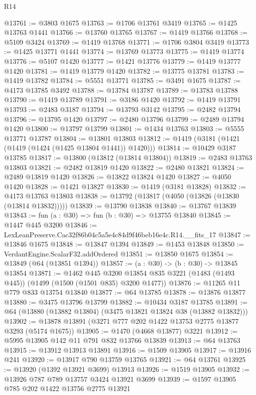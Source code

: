 \begin{lexlean}{R14}
\begin{coremodule}
@13761 := @3803 @1675
@13763 := @1706 @13761 @3419
@13765 := @1425 @13763 @1441
@13766 := @13760 @13765
@13767 := @1419 @13766
@13768 := @5109 @3424
@13769 := @1419 @13768
@13771 := @1706 @3804 @3419
@13773 := @1425 @13771 @1441
@13774 := @13769 @13773
@13775 := @1419 @13774
@13776 := @5107 @1420
@13777 := @1421 @13776
@13779 := @1419 @13777 @1420
@13781 := @1419 @13779 @1420
@13782 := @13775 @13781
@13783 := @1419 @13782
@13784 := @5551 @13771
@13785 := @3491 @1675
@13787 := @4173 @13785 @3492
@13788 := @13784 @13787
@13789 := @13783 @13788
@13790 := @1419 @13789
@13791 := @3186 @1420
@13792 := @1419 @13791
@13793 := @2483 @3187
@13794 := @13793 @3142
@13795 := @2482 @13794
@13796 := @13795 @1420
@13797 := @2480 @13796
@13799 := @2489 @13794 @1420
@13800 := @13797 @13799
@13801 := @1434 @13763
@13803 := @5555 @13771 @13787
@13804 := @13801 @13803
@13812 := @1419 (@3181 (@1421 (@1419 (@1424 (@1425 @13804 @1441)) @1420)))
@13814 := @10429 @3187 @13785
@13817 := @13800 (@13812 (@13814 @13804))
@13819 := @2483 @13763 @13803
@13821 := @2482 @13819 @1420
@13822 := @2480 @13821
@13824 := @2489 @13819 @1420
@13826 := @13822 @13824 @1420
@13827 := @4050 @1420
@13828 := @1421 @13827
@13830 := @1419 (@3181 @13828)
@13832 := @4173 @13763 @13803
@13838 := @13792 (@13817 (@4050 (@13826 (@13830 (@13814 @13832)))))
@13839 := @13790 @13838
@13840 := @13767 @13839
@13843 := fun (a : @30) => fun (b : @30) => @13755 @13840
@13845 := @1447 @445 @3200
@13846 := LexLeanPreserve.Cac32f86b04c5a5e4c84d9f46beb16e4c.R14.__fits_17
@13847 := @13846 @1675
@13848 := @13847 @1394
@13849 := @1453 @13848
@13850 := VerdantEngine.ScalarF32.addOrdered
@13851 := @13850 @1675
@13854 := @13849 (@64 (@13851 @1394))
@13857 := (a : @30) -> (b : @30) -> @13845 @13854
@13871 := @1462
    @445
    @3200
    @13854
    @835
    @3221
    (@1483 (@1493 @445))
    (@1499 (@1500 (@1501 @835) @3200 @1477))
@13876 := @11265 @11 @779 @833 @13754 @13840
@13877 := @64 @13785
@13878 := @13876 @13877
@13880 := @3475 @13796 @13799
@13882 := @10434 @3187 @13785
@13891 := @64 (@13880 (@13882 @13804) (@3475 @13821 @13824 @38 (@13882 @13832)))
@13902 := @13878 @13891 (@3271 @777 @202 @1422 @13753 @2775 @13877 @3293 (@5174 @1675))
@13905 := @1470 (@4668 @13877) @3221
@13912 := @5995 @13905 @142 @11 @791 @832 @13766 @13839
@13913 := @64 @13763
@13915 := @13912 @13913 @13891
@13916 := @1509 @13905
@13917 := @13916 @241
@13920 := @13917 @790 @13759 @13765
@13921 := @64 @13761
@13925 := @13920 (@1392 @13921 @3699) @13913
@13926 := @1519 @13905
@13932 := @13926 @787 @789 @13757 @3424 @13921 @3699
@13939 := @1597 @13905 @785 @202 @1422 @13756 @2775 @13921

\end{coremodule}
\end{lexlean}

